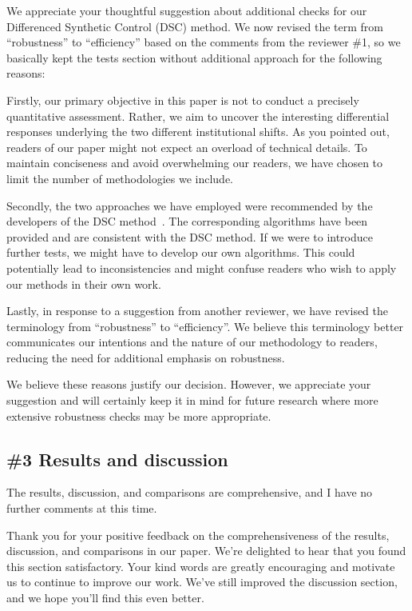 \AR{} We appreciate your thoughtful suggestion about additional checks for our Differenced Synthetic Control (DSC) method. We now revised the term from ``robustness'' to ``efficiency'' based on the comments from the reviewer \#1, so we basically kept the tests section without additional approach for the following reasons:

\AR*{} Firstly, our primary objective in this paper is not to conduct a precisely quantitative assessment. Rather, we aim to uncover the interesting differential responses underlying the two different institutional shifts. As you pointed out, readers of our paper might not expect an overload of technical details. To maintain conciseness and avoid overwhelming our readers, we have chosen to limit the number of methodologies we include.

\AR*{} Secondly, the two approaches we have employed were recommended by the developers of the DSC method~\cite{engelbrektson2023}.
The corresponding algorithms have been provided and are consistent with the DSC method. If we were to introduce further tests, we might have to develop our own algorithms. This could potentially lead to inconsistencies and might confuse readers who wish to apply our methods in their own work.

\AR*{} Lastly, in response to a suggestion from another reviewer, we have revised the terminology from ``robustness'' to ``efficiency''. We believe this terminology better communicates our intentions and the nature of our methodology to readers, reducing the need for additional emphasis on robustness.

\AR*{} We believe these reasons justify our decision. However, we appreciate your suggestion and will certainly keep it in mind for future research where more extensive robustness checks may be more appropriate.

\subsection{\#3 Results and discussion}\label{sec:2-3}

\RC{} The results, discussion, and comparisons are comprehensive, and I have no further comments at this time.

\AR{} Thank you for your positive feedback on the comprehensiveness of the results, discussion, and comparisons in our paper. We're delighted to hear that you found this section satisfactory. Your kind words are greatly encouraging and motivate us to continue to improve our work. We've still improved the discussion section, and we hope you'll find this even better.

